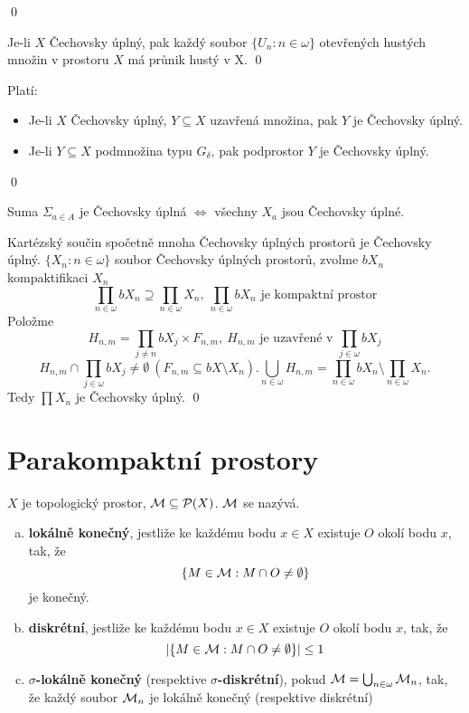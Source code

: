 \documentclass[12pt,a4paper]{article}
\begin{document}
	\qed

\veta[Boireova] Je-li $X$ Čechovsky úplný, pak každý soubor $\{U_n : n \in
	\omega\}$ otevřených hustých množin v prostoru $X$ má průnik hustý v X.
\dukaz
	\qed

\veta Platí:
\begin{itemize}
	\item Je-li $X$ Čechovsky úplný, $Y \subseteq X$ uzavřená množina, pak $Y$
		je Čechovsky úplný.
	\item Je-li $Y \subseteq X$ podmnožina typu $G_\delta$, pak podprostor $Y$
		je Čechovsky úplný.
\end{itemize}
\dukaz
	\qed

\veta Suma $\Sigma_{a \in A}$ je Čechovsky úplná $\iff$ všechny $X_a$ jsou
	Čechovsky úplné.

\veta Kartézský součin spočetně mnoha Čechovsky úplných prostorů je Čechovsky úplný.
\dukaz $\{ X_n : n \in \omega \}$ soubor Čechovsky úplných prostorů, zvolme
	$bX_n$ kompaktifikaci $X_n$
		$$\prod_{n \in \omega} bX_n \supseteq \prod_{n \in \omega}
		  X_n,~\prod_{n \in \omega} bX_n \text{ je kompaktní prostor}$$
	Položme
		$$H_{n,m} = \prod_{j \neq n} bX_j \times F_{n,m},~H_{n,m} \text{ je
		  uzavřené v } \prod_{j \in \omega} bX_j$$
		$$H_{n,m} \cap \prod_{j \in \omega} bX_j \neq \emptyset~(F_{n,m}
		  \subseteq bX \setminus X_n). \bigcup_{n \in \omega} H_{n,m} =
		  \prod_{n \in \omega} bX_n \setminus \prod_{n \in \omega} X_n.$$
	Tedy $\prod X_n$ je Čechovsky úplný.
	\qed

\section{Parakompaktní prostory}
 $X$ je topologický prostor, $\mathcal{ M } \subseteq \mathcal{ P }(X)$. $\mathcal{ M }$ se nazývá.
\begin{enumerate}[(a)]
	\item {\bf lokálně konečný}, jestliže ke každému bodu $x \in X$ existuje
	$O$ okolí bodu $x$, tak, že
		$$\{M \in \mathcal{ M } : M \cap O \neq \emptyset \}$$
	je konečný.

	\item {\bf diskrétní}, jestliže ke každému bodu $x \in X$ existuje $O$
	okolí bodu $x$, tak, že
		$$|\{ M \in \mathcal{ M } : M \cap O \neq \emptyset \}| \leq 1$$

	\item {\bf $\sigma$-lokálně konečný} (respektive {\bf $\sigma$-diskrétní}),
		pokud $\mathcal{ M } = \bigcup_{n \in \omega} \mathcal{ M }_n$, tak, že každý soubor $\mathcal{ M }_n$ je lokálně konečný (respektive diskrétní)
\end{enumerate}
\end{document}

